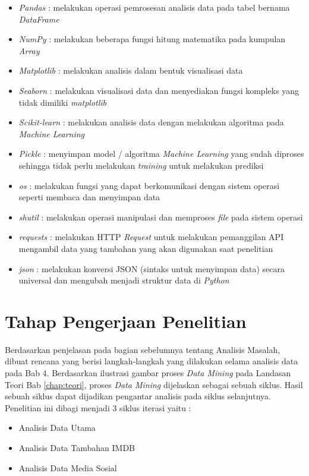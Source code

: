 \begin{itemize}
\item \textit{Pandas} : melakukan operasi pemrosesan analisis data pada tabel bernama \textit{DataFrame}
\item \textit{NumPy}  : melakukan beberapa fungsi hitung matematika pada kumpulan \textit{Array} 
\item \textit{Matplotlib} : melakukan analisis dalam bentuk visualisasi data 
\item \textit{Seaborn} : melakukan visualisasi data dan menyediakan fungsi kompleks yang tidak dimiliki \textit{matplotlib}
\item \textit{Scikit-learn} : melakukan analisis data dengan melakukan algoritma pada \textit{Machine Learning}
\item \textit{Pickle} : menyimpan model / algoritma \textit{Machine Learning} yang sudah diproses sehingga tidak perlu melakukan \textit{training} untuk melakukan prediksi 
\item \textit{os}     : melakukan fungsi yang dapat berkomunikasi dengan sistem operasi seperti membaca dan menyimpan data 
\item \textit{shutil} : melakukan operasi manipulasi dan memproses \textit{file} pada sistem operasi
\item \textit{requests} : melakukan HTTP \textit{Request} untuk	melakukan pemanggilan API mengambil data yang tambahan yang akan digunakan saat penelitian 
\item \textit{json}   : melakukan konversi JSON (sintaks untuk menyimpan data) secara universal dan mengubah menjadi struktur data di \textit{Python} 
\end{itemize}

\section{Tahap Pengerjaan Penelitian}
Berdasarkan penjelasan pada bagian sebelumnya tentang Analisis Masalah, dibuat rencana yang berisi langkah-langkah yang dilakukan selama analisis data pada Bab 4. Berdasarkan ilustrasi gambar proses \textit{Data Mining} pada Landasan Teori Bab \ref{chap:teori}, proses \textit{Data Mining} dijelaskan sebagai sebuah siklus. Hasil sebuah siklus dapat dijadikan pengantar analisis pada siklus selanjutnya. Penelitian ini dibagi menjadi 3 siklus iterasi yaitu : 

\begin{itemize}
\item Analisis Data Utama
\item Analisis Data Tambahan IMDB
\item Analisis Data Media Sosial
\end{itemize} 

